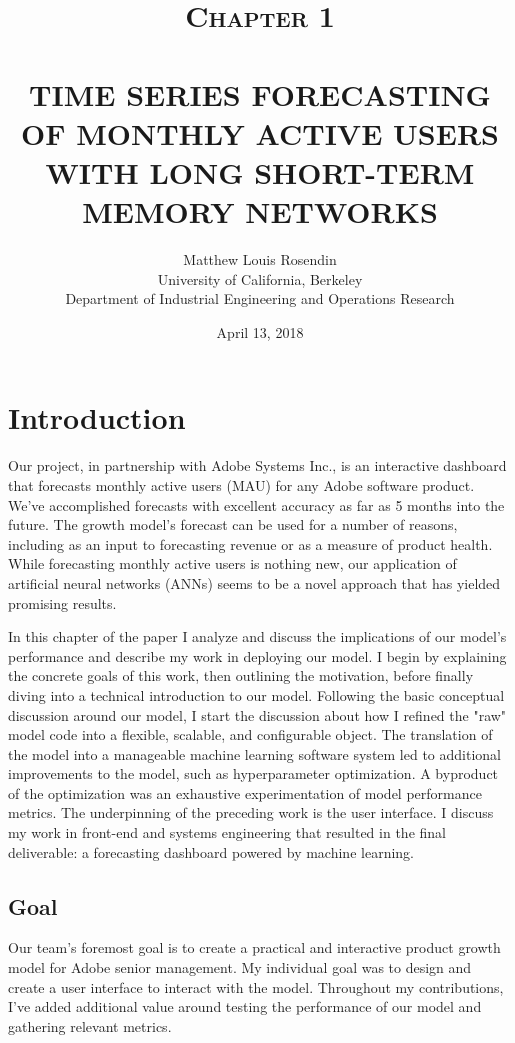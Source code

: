 \documentclass[11pt, oneside]{article}
\title{
  \normalsize \textsc{Chapter 1} \\ [2.0cm]
  \HRule{0.5pt} \\
  \LARGE \textbf{\uppercase{
  Time Series Forecasting of Monthly Active Users with Long Short-Term Memory
      Networks
  }}
  \HRule{2pt} \\ [0.5cm]
  \vspace*{5\baselineskip}
}
\author{
  Matthew Louis Rosendin \\
  University of California, Berkeley \\
  Department of Industrial Engineering and Operations Research
}
\date{April 13, 2018}
\begin{document}
\maketitle
\newpage

\tableofcontents
\newpage

\listoffigures
\newpage

\section{Introduction}
Our project, in partnership with Adobe Systems Inc., is an interactive dashboard that forecasts monthly active users (MAU) for any Adobe software product. We've accomplished forecasts with excellent accuracy as far as 5 months into the future. The growth model's forecast can be used for a number of reasons, including as an input to forecasting revenue or as a measure of product health. While forecasting monthly active users is nothing new, our application of artificial neural networks (ANNs) seems to be a novel approach that has yielded promising results.

In this chapter of the paper I analyze and discuss the implications of our model's performance and describe my work in deploying our model. I begin by explaining the concrete goals of this work, then outlining the motivation, before finally diving into a technical introduction to our model. Following the basic conceptual discussion around our model, I start the discussion about how I refined the "raw" model code into a flexible, scalable, and configurable object. The translation of the model into a manageable machine learning software system led to additional improvements to the model, such as hyperparameter optimization. A byproduct of the optimization was an exhaustive experimentation of model performance metrics. The underpinning of the preceding work is the user interface. I discuss my work in front-end and systems engineering that resulted in the final deliverable: a forecasting dashboard powered by machine learning.

\subsection{Goal}
Our team's foremost goal is to create a practical and interactive product growth model for Adobe senior management. My individual goal was to design and create a user interface to interact with the model. Throughout my contributions, I've added additional value around testing the performance of our model and gathering relevant metrics.
\end{document}
